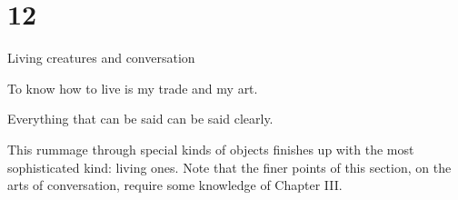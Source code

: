 {{\section{12}{Living creatures and conversation}

\widepoem
To know how to live is my trade and my art.

\widepoem
Everything that can be said can be said clearly.

\noindent
This rummage through special kinds of objects finishes up with the most
sophisticated kind: living ones.  Note that the finer points of this
section, on the arts of conversation, require some knowledge of Chapter
III.

}}
